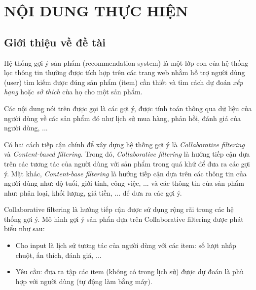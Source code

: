 \documentclass{article}[14pt]
\begin{document}
    \section{NỘI DUNG THỰC HIỆN}
    {

    
    \subsection{Giới thiệu về đề tài}
    
    
    
      Hệ thống gợi ý sản phẩm (recommendation system) là một lớp con của hệ thống
      lọc thông tin thường được tích hợp trên các trang web nhằm hỗ trợ 
      người dùng (user) tìm kiếm được đúng sản phẩm (item) cần thiết  
      và tìm cách dự đoán \textit{xếp hạng} hoặc \textit{sở thích} 
      của họ cho một sản phẩm.
      
      Các nội dung nói trên được gọi là các gợi ý, được tính toán thông qua dữ liệu
      của người dùng về các sản phẩm đó như lịch sử mua hàng, phản hồi, đánh giá của
      người dùng, ...
  
      Có hai cách tiếp cận chính để xây dựng hệ thống gợi ý là 
      \textit{Collaborative filtering} và \textit{Content-based filtering}.
      Trong đó, \textit{Collaborative filtering} là hướng tiếp cận dựa trên các 
      tương tác của người dùng với sản phẩm trong quá khứ để đưa ra các gợi ý. 
      Mặt khác, \textit{Content-base filtering} là hướng tiếp cận dựa trên các thông tin 
      của người dùng như: độ tuổi, giới tính, công việc, ... và các thông tin 
      của sản phẩm như: phân loại, khối lượng, giá tiền, ... để đưa ra các gợi ý.
  
      Collaborative filtering là hướng tiếp cận được sử dụng rộng rãi trong các 
      hệ thống gợi ý. 
      Mô hình gợi ý sản phẩn dựa trên Collaborative filtering được phát biểu như 
      sau:
      \begin{itemize}
          \item Cho input là lịch sử tương tác của người dùng với các item:
              số lượt nhấp chuột, ấn thích, đánh giá, ... 
          \item Yêu cầu: đưa ra tập các item (không có trong lịch sử) 
          được dự đoán là phù hợp với người dùng (tự động làm bằng máy).
      \end{itemize}
  
}
\end{document}
